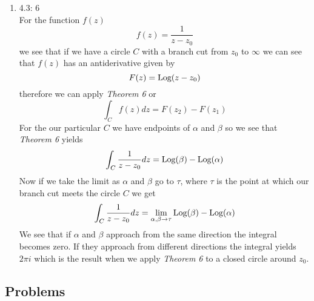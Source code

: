 \documentclass[11pt]{article}
\newcommand{\Log}{\textnormal{Log}}
\begin{document}
\begin{enumerate}
\item 4.3: 6\\
For the function $f(z)$
$$f(z) = \frac{1}{z-z_0}$$
we see that if we have a circle $C$ with a branch cut from $z_0$ to $\infty$ we can see that $f(z)$ has an antiderivative given by
$$F(z) = \Log(z-z_0)$$
therefore we can apply \emph{Theorem 6} or
$$\int_C f(z)dz = F(z_2)-F(z_1)$$
For the our particular $C$ we have endpoints of $\alpha$ and $\beta$ so we see that \emph{Theorem 6} yields
$$\int_C \frac{1}{z-z_0}dz =\Log(\beta) - \Log(\alpha)$$
Now if we take the limit as $\alpha$ and $\beta$ go to $\tau$, where $\tau$ is the point at which our branch cut meets the circle $C$ we get
$$\int_C \frac{1}{z-z_0}dz =\lim_{\alpha,\beta\rightarrow\tau}\Log(\beta) - \Log(\alpha)$$
We see that if $\alpha$ and $\beta$ approach from the same direction the integral becomes zero. If they approach from different directions the integral yields $2\pi i$ which is the result when we apply \emph{Theorem 6} to a closed circle around $z_0$.
\end{enumerate}

\subsection*{Problems}
\end{document}
